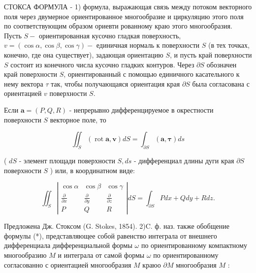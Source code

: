 \documentclass[10pt]{article}
\begin{document}
СТОКСА ФОРМУЛА - 1) формула, выражающая связь между потоком векторного поля через двумерное ориентированное многообразие и циркуляцию этого поля по соответствующим образом ориевти рованному краю этого многообразия. Пусть $S-$ ориентированная кусочно гладкая поверхность, $v=(\cos \alpha, \cos \beta, \cos \gamma)-$ единичная нормаль к поверхности $S$ (в тех точках, конечно, где она существует), задающая ориентацию $S$, и пусть край поверхности $S$ состоит из конечного числа кусочно гладких контуров. Через $\partial S$ обозначен край поверхности $S$, ориентированный с помощью единичного касательного к нему вектора $\tau$ так, чтобы получающаяся ориентация края $\partial S$ была согласована с ориентацией $v$ поверхности $S$.



Если $\boldsymbol{a}=(P, Q, R)$ - непрерывно дифференцируемое в окрестности поверхности $S$ векторное поле, то



\[

\iint_{S}(\operatorname{rot} \boldsymbol{a}, \boldsymbol{v}) d S=\int_{\partial S}(\boldsymbol{a}, \boldsymbol{\tau}) d s

\]



( $d S$ - элемент площади поверхности $S, d s$ - дифференциал длины дуги края $\partial S$ поверхности $S$ ) или, в координатном виде:



\[

\iint_{S}\left|\begin{array}{ccc}

\cos \alpha & \cos \beta & \cos \gamma \\

\frac{\partial}{\partial x} & \frac{\partial}{\partial y} & \frac{\partial}{\partial z} \\

P & Q & R

\end{array}\right| d S=\int_{\partial S} P d x+Q d y+R d z .

\]



Предложена Дж. Стоксом (G. Stokes, 1854). 2)C. ф. наз. также обобщение формулы (*), представляющее собой равенство интеграла от внешнего дифференциала дифференциальной формы $\omega$ по ориентированному компактному многообразию $M$ и интеграла от самой формы $\omega$ по ориентированному согласованно с ориентацией многообразия $M$ краюо $\partial M$ многообразия $M$ :
\end{document}
